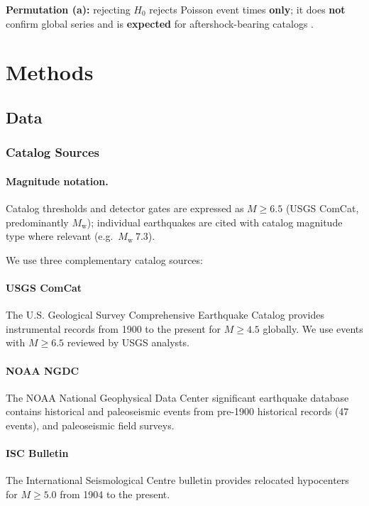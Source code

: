 \documentclass[draft]{agujournal2019}
\begin{document}
\noindent\textbf{Permutation (a):} rejecting $H_0$ rejects Poisson event times
\textbf{only}; it does \textbf{not} confirm global series and is \textbf{expected}
for aftershock-bearing catalogs \citep{Ogata1988}.

\section{Methods}
\label{sec:methods}

\subsection{Data}
\label{sec:data}

\subsubsection{Catalog Sources}

\paragraph{Magnitude notation.}
Catalog thresholds and detector gates are expressed as $M \ge 6.5$
(USGS ComCat, predominantly $M_\mathrm{w}$); individual earthquakes are cited
with catalog magnitude type where relevant (e.g.\ $M_\mathrm{w}~7.3$).

We use three complementary catalog sources:

\paragraph{USGS ComCat} The U.S. Geological Survey Comprehensive Earthquake
Catalog \citep{USGS2023} provides instrumental records from 1900 to the
present for $M \ge 4.5$ globally.
We use events with $M \ge 6.5$ reviewed by USGS analysts.

\paragraph{NOAA NGDC} The NOAA National Geophysical Data Center significant
earthquake database \citep{NOAA2023} contains historical and paleoseismic
events from pre-1900 historical records (47 events),
\citep{Ambraseys1988,Guidoboni2010} and paleoseismic field surveys.

\paragraph{ISC Bulletin} The International Seismological Centre bulletin
\citep{ISC2023,Storchak2013} provides relocated hypocenters for $M \ge 5.0$
from 1904 to the present.
\end{document}
